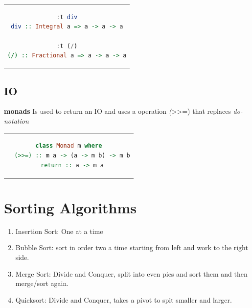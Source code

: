 \begin{center}
\begin{tabular}{c}
\begin{lstlisting}[language=Haskell]
:t div
div :: Integral a => a -> a -> a
  
:t (/)
(/) :: Fractional a => a -> a -> a
\end{lstlisting}
\end{tabular}
\end{center}
 

\subsection{IO}
\textbf{monads}
Is used to return an IO and uses a operation \emph(>>=) that replaces \emph{do-notation}
\begin{center}
\begin{tabular}{c}
\begin{lstlisting}[language=Haskell]
class Monad m where
  (>>=) :: m a -> (a -> m b) -> m b
  return :: a -> m a
\end{lstlisting}
\end{tabular}
\end{center}


\section{Sorting Algorithms}
\begin{enumerate}
\item Insertion Sort: One at a time
\item Bubble Sort: sort in order two a time starting from left and work to the right side.
\item Merge Sort: Divide and Conquer, split into even pies and sort them and then merge/sort again. 
\item Quicksort: Divide and Conquer, takes a pivot to spit smaller and larger.
\end{enumerate}
